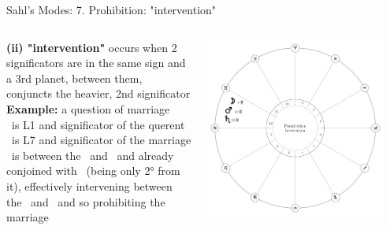 \begin{frame}[t]{Sahl's Modes: 7. Prohibition: "intervention"}
\begin{columns}[T, onlytextwidth]
\vspace{0.5cm}
\textbf{(ii) "intervention"} occurs when 2 significators are in the same sign and a 3rd planet, between them, conjuncts the heavier, 2nd significator  \\

\vspace{0.25cm}
\textbf{Example:} a question of marriage \\
\ul
\Moon\ is L1 and significator of the querent \\
\Saturn\ is L7 and significator of the marriage \\

\vspace{0.25cm}
\Mars\ is between the \Moon\ and \Saturn\ and already conjoined with \Saturn\ (being only 2° from it), effectively intervening between the \Moon\ and \Saturn\ and so prohibiting the  marriage
	
\begin{center}
{\includegraphics[width=0.9\textwidth]{charts/63-intervention}} \\
\end{center}
\end{columns}
\end{frame}
